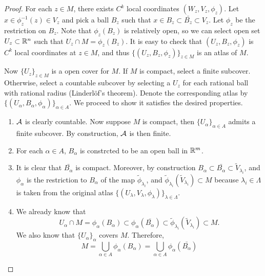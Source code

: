 \documentclass[a4paper]{article}
\begin{document}
\begin{proof}
  For each $z \in M$, there exists $C^k$ local coordinates $(W_z, V_z,
    \phi_z)$. Let $x \in \phi_z^{-1}(z) \in V_z$ and pick a ball $B_z$ such
  that $x \in B_z \subset \bar{B_z} \subset V_z$. Let $\phi_z$ be the
  restriction on $B_z$. Note that $\phi_z(B_z)$ is relatively open, so we
  can select open set $U_z \subset \mathbb{R}^n$ such that $U_z \cap M = \phi_z
    (B_z)$. It is easy to check that $(U_z, B_z, \phi_z)$ is $C^k$ local
  coordinates at $z \in M$, and thus $\{(U_z, B_z, \phi_z)\}_{z \in M}$ is
  an atlas of $M$.

  Now $\{U_z\}_{z \in M}$ is a open cover for $M$. If $M$ is compact,
  select a finite subcover. Otherwise, select a countable subcover by
  selecting a $U_z$ for each rational ball with rational radius
  (Linderl\"of's theorem). Denote the corresponding atlas by $\{(U_\alpha,
  B_\alpha, \phi_\alpha)\}_{\alpha \in A}$. We proceed to show it
  satisfies the desired properties.

  \begin{enumerate}
    \item $\mathcal{A}$ is clearly countable. Now suppose $M$ is
          compact, then $\{U_\alpha\}_{\alpha \in A}$ admits a finite
          subcover. By construction, $\mathcal{A}$ is then finite.

    \item For each $\alpha \in A$, $B_{\alpha}$ is constrcted to be an
          open ball in $\mathbb{R}^m$.

    \item It is clear that $\bar{B_{\alpha}}$ is compact. Moreover, by
          construction $B_{\alpha} \subset \bar{B_{\alpha}} \subset
          \tilde{V}_{\lambda_i}$, and $\phi_{\alpha}$ is the restriction
          to $B_{\alpha}$ of the map $\tilde{\phi}_{\lambda_i}$, and
          $\tilde{\phi}_{\lambda_i}(\tilde{V}_{\lambda_i}) \subset M$
          because $\lambda_i \in \Lambda$ is taken from the original atlas
          $\{(U_\lambda, V_\lambda, \phi_\lambda)\}_{\lambda \in
          \Lambda}$.

    \item We already know that
          \[
            U_\alpha \cap M
            = \phi_{\alpha} (B_{\alpha})
            \subset \phi_{\alpha} ( \bar{B_{\alpha}} )
            \subset \tilde{\phi}_{\lambda_i} (\tilde{V}_{\lambda_i})
            \subset M.
          \]
          We also know that $\{U_\alpha\}_{\alpha}$ covers $M$. Therefore,
          \[
            M = \bigcup_{\alpha \in A} \phi_{\alpha} (B_{\alpha})
            = \bigcup_{\alpha \in A} \phi_{\alpha} (\bar{B_{\alpha}})
          \]


\end{enumerate}
\end{proof}
\end{document}
